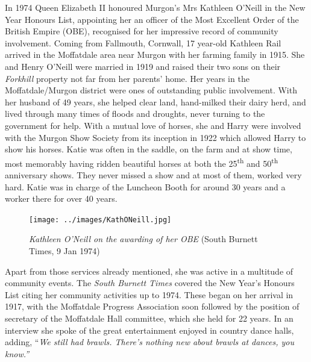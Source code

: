 In 1974 Queen Elizabeth II honoured Murgon's Mrs Kathleen O'Neill in the New Year Honours List, appointing her an officer of the Most Excellent Order of the British Empire (OBE), recognised for her impressive record of community involvement. Coming from Fallmouth, Cornwall, 17 year-old Kathleen Rail arrived in the Moffatdale area near Murgon with her farming family in 1915. She and Henry O'Neill were married in 1919 and raised their two sons on their \emph{Forkhill} property not far from her parents' home. Her years in the Moffatdale/Murgon district were ones of outstanding public involvement. With her husband of 49 years, she helped clear land, hand-milked their dairy herd, and lived through many times of floods and droughts, never turning to the government for help. With a mutual love of horses, she and Harry were involved with the Murgon Show Society from its inception in 1922 which allowed Harry to show his horses. Katie was often in the saddle, on the farm and at show time, most memorably having ridden beautiful horses at both the 25\textsuperscript{th} and 50\textsuperscript{th} anniversary shows. They never missed a show and at most of them, worked very hard. Katie was in charge of the Luncheon Booth for around 30 years and a worker there for over 40 years.









\begin{figure}
\begin{center}
\texttt{[image: ../images/KathONeill.jpg]}
\caption{{\itshape Kathleen O'Neill on the awarding of her OBE} {\scriptsize(South Burnett Times, 9 Jan 1974)}}
\end{center}
\end{figure}




Apart from those services already mentioned, she was active in a multitude of community events. The \emph{South Burnett Times} covered the New Year's Honours List citing her community activities up to 1974. These began on her arrival in 1917, with the Moffatdale Progress Association soon followed by the position of secretary of the Moffatdale Hall committee, which she held for 22 years. In an interview she spoke of the great entertainment enjoyed in country dance halls, adding, ``\emph{We still had brawls. There's nothing new about brawls at dances, you know.''}



